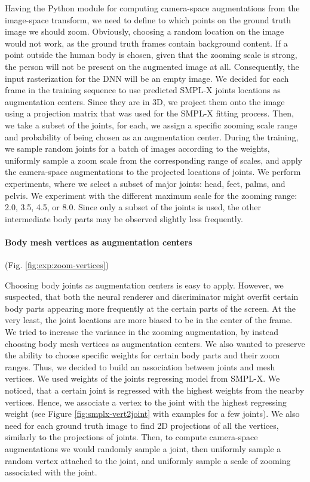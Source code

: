 Having the Python module for computing camera-space augmentations from the image-space transform, we need to define to which points on the ground truth image we should zoom. Obviously, choosing a random location on the image would not work, as the ground truth frames contain background content. If a point outside the human body is chosen, given that the zooming scale is strong, the person will not be present on the augmented image at all. Consequently, the input rasterization for the DNN will be an empty image. We decided for each frame in the training sequence to use predicted SMPL-X joints locations as augmentation centers. Since they are in 3D, we project them onto the image using a projection matrix that was used for the SMPL-X fitting process. Then, we take a subset of the joints, for each, we assign a specific zooming scale range and probability of being chosen as an augmentation center. During the training, we sample random joints for a batch of images according to the weights, uniformly sample a zoom scale from the corresponding range of scales, and apply the camera-space augmentations to the projected locations of joints. We perform experiments, where we select a subset of major joints: head, feet, palms, and pelvis. We experiment with the different maximum scale for the zooming range: 2.0, 3.5, 4.5, or 8.0. Since only a subset of the joints is used, the other intermediate body parts may be observed slightly less frequently.

\vspace{-15pt}\paragraph{Body mesh vertices as augmentation centers}(Fig. \ref{fig:exp:zoom-vertices})\mbox{}\nopagebreak

Choosing body joints as augmentation centers is easy to apply. However, we suspected, that both the neural renderer and discriminator might overfit certain body parts appearing more frequently at the certain parts of the screen. At the very least, the joint locations are more biased to be in the center of the frame. We tried to increase the variance in the zooming augmentation, by instead choosing body mesh vertices as augmentation centers. We also wanted to preserve the ability to choose specific weights for certain body parts and their zoom ranges. Thus, we decided to build an association between joints and mesh vertices. We used weights of the joints regressing model from SMPL-X. We noticed, that a certain joint is regressed with the highest weights from the nearby vertices. Hence, we associate a vertex to the joint with the highest regressing weight (see Figure \ref{fig:smplx-vert2joint} with examples for a few joints).  We also need for each ground truth image to find 2D projections of all the vertices, similarly to the projections of joints. Then, to compute camera-space augmentations we would randomly sample a joint, then uniformly sample a random vertex attached to the joint, and uniformly sample a scale of zooming associated with the joint. 

